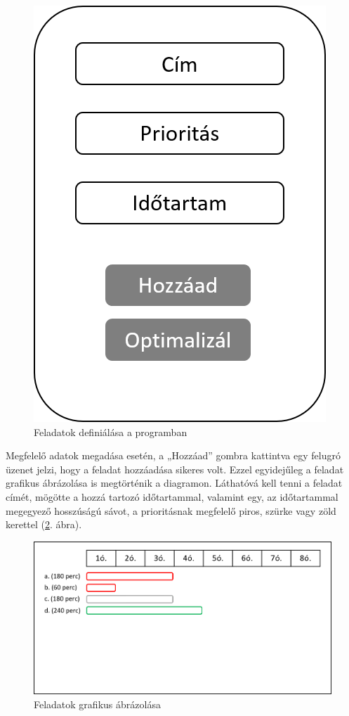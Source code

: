 \begin{figure}[h]
	\centering
	\includegraphics[scale=0.6]{images/addTasks.png}
	\caption{Feladatok definiálása a programban}
	\label{fig:addTasks}
\end{figure}

Megfelelő adatok megadása esetén, a „Hozzáad” gombra kattintva egy felugró üzenet jelzi, hogy a feladat hozzáadása sikeres volt. Ezzel egyidejűleg a feladat grafikus ábrázolása is megtörténik a diagramon. Láthatóvá kell tenni a feladat címét, mögötte a hozzá tartozó időtartammal, valamint egy, az időtartammal megegyező hosszúságú sávot, a prioritásnak megfelelő piros, szürke vagy zöld kerettel (\ref{fig:diagram}. ábra).

\begin{figure}[h]
	\centering
	\includegraphics[scale=0.8]{images/diagram.png}
	\caption{Feladatok grafikus ábrázolása}
	\label{fig:diagram}
\end{figure}


